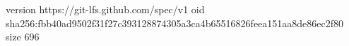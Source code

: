 version https://git-lfs.github.com/spec/v1
oid sha256:fbb40ad9502f31f27c393128874305a3ca4b65516826feea151aa8de86ec2f80
size 696
